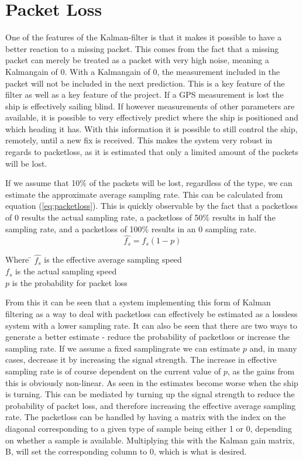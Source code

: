 \chapter{Packet Loss}
\label{chap:PacketLoss}

One of the features of the Kalman-filter is that it makes it possible to have a better reaction to a missing packet. This comes from the fact that a missing packet can merely be treated as a packet with very high noise, meaning a Kalmangain of 0. With a Kalmangain of 0, the measurement included in the packet will not be included in the next prediction. This is a key feature of the filter as well as a key feature of the project.
If a GPS measurement is lost the ship is effectively sailing blind. If however measurements of other parameters are available, it is possible to very effectively predict where the ship is positioned and which heading it has. With this information it is possible to still control the ship, remotely, until a new fix is received. This makes the system very robust in regards to packetloss, as it is estimated that only a limited amount of the packets will be lost. 

If we assume that 10$\%$ of the packets will be lost, regardless of the type, we can estimate the approximate average sampling rate. This can be calculated from equation (\ref{eq:packetloss}). This is quickly observable by the fact that a packetloss of 0 results the actual sampling rate, a packetloss of 50$\%$ results in half the sampling rate, and a packetloss of 100$\%$ results in an 0 sampling rate.
\begin{equation}
\hat{f_s} = f_s(1-p)
\end{equation}
\label{eq:packetloss}
\begin{tabbing}
Where \= $\hat{f_s}$ is the effective average sampling speed\\
\> $f_s$ is the actual sampling speed\\
\> $p$ is the probability for packet loss
\end{tabbing}
From this it can be seen that a system implementing this form of Kalman filtering as a way to deal with packetloss can effectively be estimated as a lossless system with a lower sampling rate.
It can also be seen that there are two ways to generate a better estimate - reduce the probability of packetloss or increase the sampling rate.
If we assume a fixed samplingrate we can estimate $p$ and, in many cases, decrease it by increasing the signal strength. The increase in effective sampling rate is of course dependent on the current value of $p$, as the gains from this is obviously non-linear. As seen in  the estimates become worse when the ship is turning. This can be mediated by turning up the signal strength to reduce the probability of packet loss, and therefore increasing the effective average sampling rate. 
The packetloss can be handled by having a matrix with the index on the diagonal corresponding to a given type of sample being either 1 or 0, depending on whether a sample is available. Multiplying this with the Kalman gain matrix, B, will set the corresponding column to 0, which is what is desired.